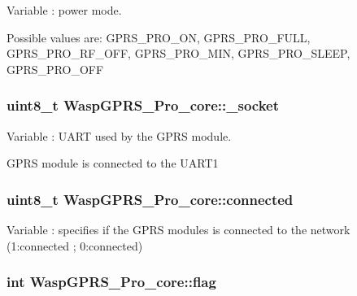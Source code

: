 Variable \+: power mode. 

Possible values are\+: G\+P\+R\+S\+\_\+\+P\+R\+O\+\_\+\+ON, G\+P\+R\+S\+\_\+\+P\+R\+O\+\_\+\+F\+U\+LL, G\+P\+R\+S\+\_\+\+P\+R\+O\+\_\+\+R\+F\+\_\+\+O\+FF, G\+P\+R\+S\+\_\+\+P\+R\+O\+\_\+\+M\+IN, G\+P\+R\+S\+\_\+\+P\+R\+O\+\_\+\+S\+L\+E\+EP, G\+P\+R\+S\+\_\+\+P\+R\+O\+\_\+\+O\+FF 
\subsubsection[{\texorpdfstring{\+\_\+socket}{_socket}}]{\setlength{\rightskip}{0pt plus 5cm}uint8\+\_\+t Wasp\+G\+P\+R\+S\+\_\+\+Pro\+\_\+core\+::\+\_\+socket}\hypertarget{class_wasp_g_p_r_s___pro__core_a88295f0945d2f69eef16e8ef71dbc0d1}{}\label{class_wasp_g_p_r_s___pro__core_a88295f0945d2f69eef16e8ef71dbc0d1}


Variable \+: U\+A\+RT used by the G\+P\+RS module. 

G\+P\+RS module is connected to the U\+A\+R\+T1 
\subsubsection[{\texorpdfstring{connected}{connected}}]{\setlength{\rightskip}{0pt plus 5cm}uint8\+\_\+t Wasp\+G\+P\+R\+S\+\_\+\+Pro\+\_\+core\+::connected}\hypertarget{class_wasp_g_p_r_s___pro__core_ae43873d27e34f722254bac8c283d4d2b}{}\label{class_wasp_g_p_r_s___pro__core_ae43873d27e34f722254bac8c283d4d2b}
Variable \+: specifies if the G\+P\+RS modules is connected to the network (1\+:connected ; 0\+:connected) 
\subsubsection[{\texorpdfstring{flag}{flag}}]{\setlength{\rightskip}{0pt plus 5cm}int Wasp\+G\+P\+R\+S\+\_\+\+Pro\+\_\+core\+::flag}\hypertarget{class_wasp_g_p_r_s___pro__core_a39db9f922e8dca6aeef93010e42ae416}{}\label{class_wasp_g_p_r_s___pro__core_a39db9f922e8dca6aeef93010e42ae416}


